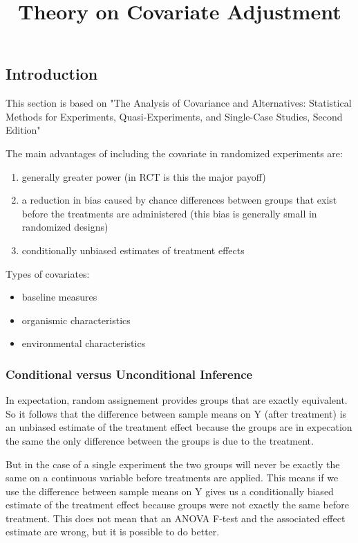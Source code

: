 \documentclass{article}
\title{Theory on Covariate Adjustment}
\begin{document}
\maketitle 
\subsection{Introduction}
This section is based on "The Analysis of Covariance and Alternatives: Statistical Methods for Experiments, Quasi-Experiments, and Single-Case Studies, Second Edition"

The main advantages of including the covariate in randomized experiments are: 
\begin{enumerate}
  \item generally greater power (in RCT is this the major payoff)
  \item a reduction in bias caused by chance differences between groups that exist before the treatments are administered (this bias is generally small in randomized designs) 
  \item conditionally unbiased estimates of treatment effects 
\end{enumerate}

Types of covariates: 
\begin{itemize}
  \item baseline measures 
  \item organismic characteristics 
  \item environmental characteristics 
\end{itemize}

\subsubsection*{Conditional versus Unconditional Inference}
In expectation, random assignement provides groups that are exactly equivalent. So it follows that the difference between sample  means on Y (after treatment) is an unbiased estimate of the treatment effect because the groups are in expecation the same the only difference between the groups is due to the treatment.

But in the case of a single experiment the two groups will never be exactly the same on a continuous variable before treatments are applied. This means if we use the difference between sample means on Y gives us a conditionally biased estimate of the treatment effect because groups were not exactly the same before treatment. This does not mean that an ANOVA F-test and the associated effect estimate are wrong, but it is possible to do better.
\end{document}
